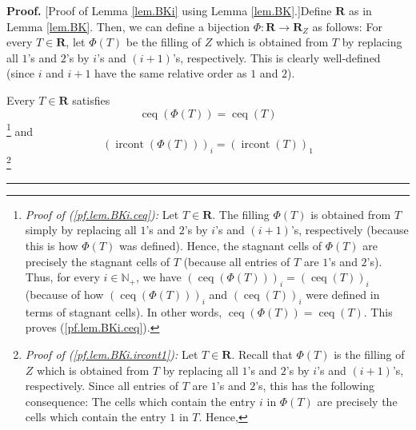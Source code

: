 \documentclass[numbers=enddot,12pt,final,onecolumn,notitlepage]{scrartcl}%
\theoremstyle{definition}
\newenvironment{proof}[1][Proof]{\noindent\textbf{#1.} }{\ \rule{0.5em}{0.5em}}
\newenvironment{verlong}{}{}
\begin{document}
\begin{verlong}
\begin{proof}
[Proof of Lemma \ref{lem.BKi} using Lemma \ref{lem.BK}.]Define $\mathbf{R}$ as
in Lemma \ref{lem.BK}. Then, we can define a bijection $\Phi:\mathbf{R}%
\rightarrow\mathbf{R}_{Z}$ as follows: For every $T\in\mathbf{R}$, let
$\Phi\left(  T\right)  $ be the filling of $Z$ which is obtained from $T$ by
replacing all $1$'s and $2$'s by $i$'s and $\left(  i+1\right)  $'s,
respectively. This is clearly well-defined (since $i$ and $i+1$ have the same
relative order as $1$ and $2$).

Every $T\in\mathbf{R}$ satisfies%
\begin{equation}
\operatorname*{ceq}\left(  \Phi\left(  T\right)  \right)  =\operatorname*{ceq}%
\left(  T\right)  \label{pf.lem.BKi.ceq}%
\end{equation}
\footnote{\textit{Proof of (\ref{pf.lem.BKi.ceq}):} Let $T\in\mathbf{R}$. The
filling $\Phi\left(  T\right)  $ is obtained from $T$ simply by replacing all
$1$'s and $2$'s by $i$'s and $\left(  i+1\right)  $'s, respectively (because
this is how $\Phi\left(  T\right)  $ was defined). Hence, the stagnant cells
of $\Phi\left(  T\right)  $ are precisely the stagnant cells of $T$ (because
all entries of $T$ are $1$'s and $2$'s). Thus, for every $i\in\mathbb{N}_{+}$,
we have $\left(  \operatorname*{ceq}\left(  \Phi\left(  T\right)  \right)
\right)  _{i}=\left(  \operatorname*{ceq}\left(  T\right)  \right)  _{i}$
(because of how $\left(  \operatorname*{ceq}\left(  \Phi\left(  T\right)
\right)  \right)  _{i}$ and $\left(  \operatorname*{ceq}\left(  T\right)
\right)  _{i}$ were defined in terms of stagnant cells). In other words,
$\operatorname*{ceq}\left(  \Phi\left(  T\right)  \right)
=\operatorname*{ceq}\left(  T\right)  $. This proves (\ref{pf.lem.BKi.ceq}).}
and%
\begin{equation}
\left(  \operatorname*{ircont}\left(  \Phi\left(  T\right)  \right)  \right)
_{i}=\left(  \operatorname*{ircont}\left(  T\right)  \right)  _{1}
\label{pf.lem.BKi.ircont1}%
\end{equation}
\footnote{\textit{Proof of (\ref{pf.lem.BKi.ircont1}):} Let $T\in\mathbf{R}$.
Recall that $\Phi\left(  T\right)  $ is the filling of $Z$ which is obtained
from $T$ by replacing all $1$'s and $2$'s by $i$'s and $\left(  i+1\right)
$'s, respectively. Since all entries of $T$ are $1$'s and $2$'s, this has the
following consequence: The cells which contain the entry $i$ in $\Phi\left(
T\right)  $ are precisely the cells which contain the entry $1$ in $T$. Hence,%
}
\end{proof}
\end{verlong}
\end{document}
